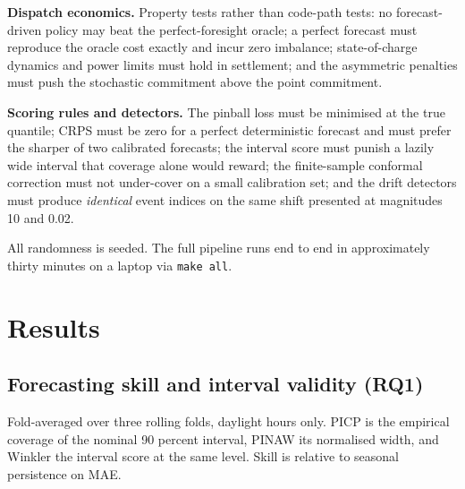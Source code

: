 \documentclass[11pt,a4paper,oneside]{report}
\begin{document}
\textbf{Dispatch economics.} Property tests rather than code-path tests: no forecast-driven policy may beat the perfect-foresight oracle; a perfect forecast must reproduce the oracle cost exactly and incur zero imbalance; state-of-charge dynamics and power limits must hold in settlement; and the asymmetric penalties must push the stochastic commitment above the point commitment.

\textbf{Scoring rules and detectors.} The pinball loss must be minimised at the true quantile; CRPS must be zero for a perfect deterministic forecast and must prefer the sharper of two calibrated forecasts; the interval score must punish a lazily wide interval that coverage alone would reward; the finite-sample conformal correction must not under-cover on a small calibration set; and the drift detectors must produce \emph{identical} event indices on the same shift presented at magnitudes 10 and 0.02.

All randomness is seeded. The full pipeline runs end to end in approximately thirty minutes on a laptop via \texttt{make all}.


\chapter{Results}

\section{Forecasting skill and interval validity (RQ1)}

Fold-averaged over three rolling folds, daylight hours only. PICP is the empirical coverage of the nominal 90 percent interval, PINAW its normalised width, and Winkler the interval score at the same level. Skill is relative to seasonal persistence on MAE.
\end{document}
